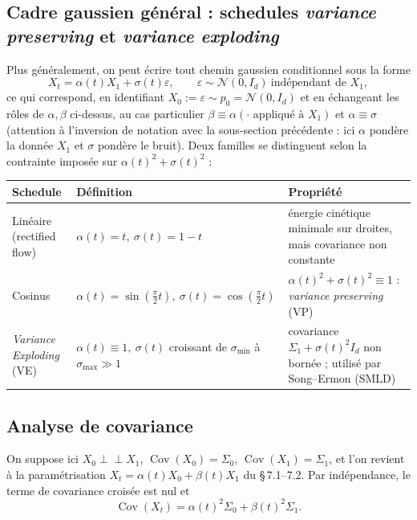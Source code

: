 \documentclass[11pt,a4paper]{article}
\theoremstyle{definition}
\theoremstyle{plain}
\theoremstyle{remark}
\newcommand{\independent}{\perp\!\!\!\perp}
\DeclareMathOperator{\Cov}{Cov}
\begin{document}
\subsection{Cadre gaussien général : schedules \textit{variance preserving} et \textit{variance exploding}}

Plus généralement, on peut écrire tout chemin gaussien conditionnel sous la forme
\[
  X_t = \alpha(t)X_1 + \sigma(t)\varepsilon,
  \qquad \varepsilon\sim\mathcal{N}(0,I_d)\ \text{indépendant de } X_1,
\]
ce qui correspond, en identifiant $X_0:=\varepsilon\sim p_0=\mathcal{N}(0,I_d)$
et en échangeant les rôles de $\alpha,\beta$ ci-dessus, au cas particulier
$\beta\equiv\alpha(\cdot\text{ appliqué à }X_1)$ et $\alpha\equiv\sigma$
(attention à l'inversion de notation avec la sous-section précédente : ici
$\alpha$ pondère la donnée $X_1$ et $\sigma$ pondère le bruit). Deux familles se
distinguent selon la contrainte imposée sur $\alpha(t)^2+\sigma(t)^2$ :

\begin{center}
\small
\renewcommand{\arraystretch}{1.4}
\begin{tabular}{@{}p{2.9cm}p{4.0cm}p{6.0cm}@{}}
\toprule
\textbf{Schedule} & \textbf{Définition} & \textbf{Propriété} \\
\midrule
Linéaire (rectified flow) & $\alpha(t)=t,\ \sigma(t)=1-t$ & énergie cinétique minimale sur droites, mais covariance non constante \\
Cosinus & $\alpha(t)=\sin(\tfrac{\pi}{2}t),\ \sigma(t)=\cos(\tfrac{\pi}{2}t)$ & $\alpha(t)^2+\sigma(t)^2\equiv 1$ : \emph{variance preserving} (VP) \\
\emph{Variance Exploding} (VE) & $\alpha(t)\equiv 1,\ \sigma(t)$ croissant de $\sigma_{\min}$ à $\sigma_{\max}\gg 1$ & covariance $\Sigma_1+\sigma(t)^2 I_d$ non bornée ; utilisé par Song--Ermon (SMLD) \\
\bottomrule
\end{tabular}
\end{center}

\subsection{Analyse de covariance}

On suppose ici $X_0\independent X_1$, $\Cov(X_0)=\Sigma_0$, $\Cov(X_1)=\Sigma_1$,
et l'on revient à la paramétrisation $X_t=\alpha(t)X_0+\beta(t)X_1$ du
\S\,7.1--7.2. Par indépendance, le terme de covariance croisée est nul et
\[
  \Cov(X_t) = \alpha(t)^2\Sigma_0+\beta(t)^2\Sigma_1.
\]
\end{document}
